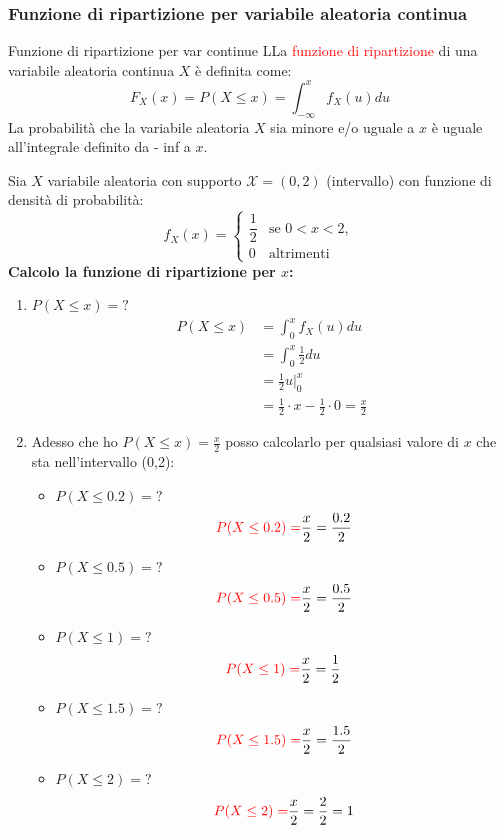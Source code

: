 \documentclass{article}  %
\theoremstyle{definition}
\begin{document}
\subsubsection{Funzione di ripartizione per variabile aleatoria continua}
\begin{theorem}{Funzione di ripartizione per var continue}
	LLa \textcolor{red}{funzione di ripartizione} di una variabile aleatoria continua $X$ è definita come:
	\[
		F_{X}(x)=P(X \leq x)=\int_{- \infty}^{x}f_X(u)du
	\]
	La probabilità che la variabile aleatoria $X$ sia minore e/o uguale a $x$ è uguale all'integrale definito da - inf a $x$. \\
\end{theorem}
\begin{esercizio}[Esercizio]
	Sia $X$ variabile aleatoria con supporto $\mathscr{X}=(0,2)$ (intervallo) con funzione di densità di probabilità:
	\[
		f_X(x) =
		\begin{cases}
			\dfrac{1}{2} & \text{se } 0 < x < 2, \\[2mm]
			0            & \text{altrimenti}
		\end{cases}
	\]
	\textbf{Calcolo la funzione di ripartizione per $x$:}
	\begin{enumerate}
		\item $P(X \leq x)=?$
		      \begin{align*}
			      P(X \leq x)
			       & = \int_{0}^{x}f_X(u)du                                  \\
			       & = \int_{0}^{x}\frac{1}{2}du                             \\
			       & = \frac{1}{2}u \Big|_{0}^{x}                            \\
			       & = \frac{1}{2}\cdot x - \frac{1}{2}\cdot 0 = \frac{x}{2}
		      \end{align*}
		\item Adesso che ho $P(X \leq x)=\frac{x}{2}$ posso calcolarlo per qualsiasi valore di $x$ che sta nell'intervallo (0,2):
		      \begin{itemize}
			      \item $P(X \leq 0.2)=?$
			            \[
				            \textcolor{red}{P(X \leq 0.2)=}\frac{x}{2}=\frac{0.2}{2}
			            \]
			      \item $P(X \leq 0.5)=?$
			            \[
				            \textcolor{red}{P(X \leq 0.5)=}\frac{x}{2}=\frac{0.5}{2}
			            \]
			      \item $P(X \leq 1)=?$
			            \[
				            \textcolor{red}{P(X \leq 1)=}\frac{x}{2}=\frac{1}{2}
			            \]
			      \item $P(X \leq 1.5)=?$
			            \[
				            \textcolor{red}{P(X \leq 1.5)=}\frac{x}{2}=\frac{1.5}{2}
			            \]
			      \item $P(X \leq 2)=?$
			            \[
				            \textcolor{red}{P(X \leq 2)=}\frac{x}{2}=\frac{2}{2}=1
			            \]
		      \end{itemize}
	\end{enumerate}
\end{esercizio}
\end{document}
